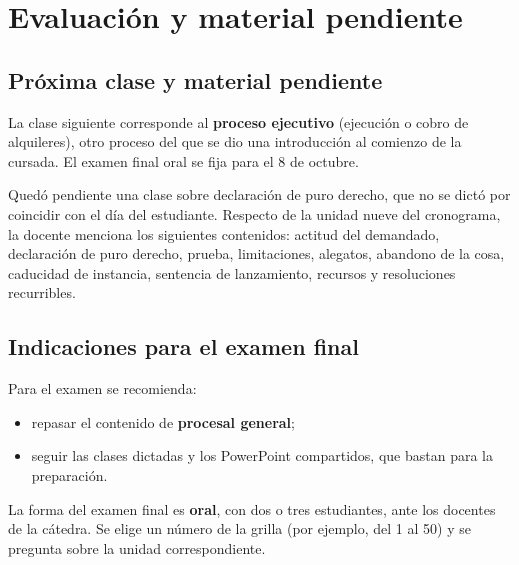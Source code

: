 \documentclass[12pt,oneside]{book}
\begin{document}
\chapter[Evaluación y material pendiente]{Evaluación y material pendiente}

\section{Próxima clase y material pendiente}

La clase siguiente corresponde al \textbf{proceso ejecutivo} (ejecución o cobro de alquileres), otro proceso del que se dio una introducción al comienzo de la cursada. El examen final oral se fija para el 8 de octubre.

Quedó pendiente una clase sobre declaración de puro derecho, que no se dictó por coincidir con el día del estudiante. Respecto de la unidad nueve del cronograma, la docente menciona los siguientes contenidos: actitud del demandado, declaración de puro derecho, prueba, limitaciones, alegatos, abandono de la cosa, caducidad de instancia, sentencia de lanzamiento, recursos y resoluciones recurribles.


\section{Indicaciones para el examen final}

Para el examen se recomienda:

\begin{itemize}
    \item repasar el contenido de \textbf{procesal general};
    \item seguir las clases dictadas y los PowerPoint compartidos, que bastan para la preparación.
\end{itemize}

La forma del examen final es \textbf{oral}, con dos o tres estudiantes, ante los docentes de la cátedra. Se elige un número de la grilla (por ejemplo, del 1 al 50) y se pregunta sobre la unidad correspondiente.
\end{document}
